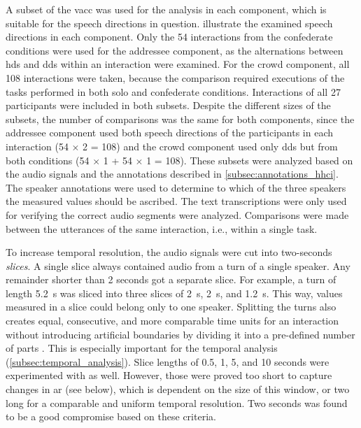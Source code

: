 A subset of the \ac{vacc} was used for the analysis in each component, which is suitable for the speech directions in question.
 illustrate the examined speech directions in each component.
Only the 54 interactions from the confederate conditions were used for the addressee component, as the alternations between \ac{hds} and \ac{dds} within an interaction were examined.
For the crowd component, all 108 interactions were taken, because the comparison required executions of the tasks performed in both solo and confederate conditions.
Interactions of all 27 participants were included in both subsets.
Despite the different sizes of the subsets, the number of comparisons was the same for both components, since the addressee component used both speech directions of the participants in each interaction (54 $\times$ 2 = 108) and the crowd component used only \ac{dds} but from both conditions (54 $\times$ 1 + 54 $\times$ 1 = 108).
These subsets were analyzed based on the audio signals and the annotations described in \cref{subsec:annotations_hhci}.
The speaker annotations were used to determine to which of the three speakers the measured values should be ascribed.
The text transcriptions were only used for verifying the correct audio segments were analyzed.
Comparisons were made between the utterances of the same interaction, i.e., within a single task.

To increase temporal resolution, the audio signals were cut into two-seconds \emph{slices}.
A single slice always contained audio from a turn of a single speaker.
Any remainder shorter than 2 seconds got a separate slice.
For example, a turn of length \SI{5.2}{\second} was sliced into three slices of \SI{2}{\second}, \SI{2}{\second}, and \SI{1.2}{\second}.
This way, values measured in a slice could belong only to one speaker.
Splitting the turns also creates equal, consecutive, and more comparable time units for an interaction without introducing artificial boundaries by dividing it into a pre-defined number of parts \citep[as in][]{Silber-Varod2018prosodic}.
This is especially important for the temporal analysis (\cref{subsec:temporal_analysis}).
Slice lengths of 0.5, 1, 5, and 10 seconds were experimented with as well.
However, those were proved too short to capture changes in \ac{ar} (see below), which is dependent on the size of this window, or two long for a comparable and uniform temporal resolution.
Two seconds was found to be a good compromise based on these criteria.

